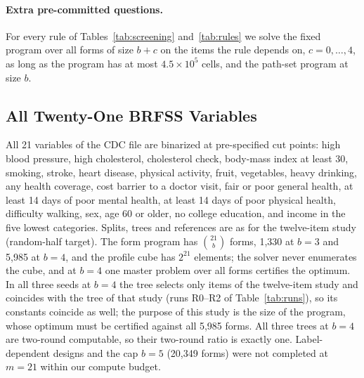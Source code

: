 \paragraph{Extra pre-committed questions.}\label{app:capcurve}
For every rule of Tables~\ref{tab:screening} and~\ref{tab:rules} we solve the fixed program over all forms of size $b+c$ on the items the rule depends on, $c=0,\ldots,4$, as long as the program has at most $4.5\times10^5$ cells, and the path-set program at size $b$.

\nCapcurveAppendixText

\subsection{All Twenty-One BRFSS Variables}\label{app:scale}
All 21 variables of the CDC file are binarized at pre-specified cut points: high blood pressure, high cholesterol, cholesterol check, body-mass index at least 30, smoking, stroke, heart disease, physical activity, fruit, vegetables, heavy drinking, any health coverage, cost barrier to a doctor visit, fair or poor general health, at least 14 days of poor mental health, at least 14 days of poor physical health, difficulty walking, sex, age 60 or older, no college education, and income in the five lowest categories. Splits, trees and references are as for the twelve-item study (random-half target). The form program has $\binom{21}b$ forms, 1,330 at $b=3$ and 5,985 at $b=4$, and the profile cube has $2^{21}$ elements; the solver never enumerates the cube, and at $b=4$ one master problem over all forms certifies the optimum. In all three seeds at $b=4$ the tree selects only items of the twelve-item study and coincides with the tree of that study (runs R0--R2 of Table~\ref{tab:runs}), so its constants coincide as well; the purpose of this study is the size of the program, whose optimum must be certified against all 5,985 forms. All three trees at $b=4$ are two-round computable, so their two-round ratio is exactly one. Label-dependent designs and the cap $b=5$ (20,349 forms) were not completed at $m=21$ within our compute budget.



